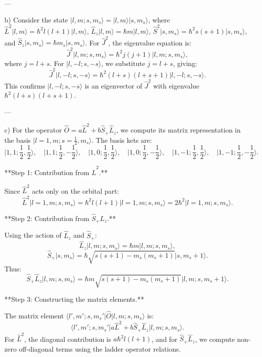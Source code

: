 ---

b) Consider the state $\lvert l, m; s, m_s \rangle = \lvert l, m \rangle \lvert s, m_s \rangle$, where $\hat{L}^2 \lvert l, m \rangle = \hbar^2 l(l+1) \lvert l, m \rangle$, $\hat{L}_z \lvert l, m \rangle = \hbar m \lvert l, m \rangle$, $\hat{S}^2 \lvert s, m_s \rangle = \hbar^2 s(s+1) \lvert s, m_s \rangle$, and $\hat{S}_z \lvert s, m_s \rangle = \hbar m_s \lvert s, m_s \rangle$. For $\hat{J}^2$, the eigenvalue equation is:
\[
\hat{J}^2 \lvert l, m; s, m_s \rangle = \hbar^2 j(j+1) \lvert l, m; s, m_s \rangle,
\]
where $j = l + s$. For $\lvert l, -l; s, -s \rangle$, we substitute $j = l + s$, giving:
\[
\hat{J}^2 \lvert l, -l; s, -s \rangle = \hbar^2 (l+s)(l+s+1) \lvert l, -l; s, -s \rangle.
\]
This confirms $\lvert l, -l; s, -s \rangle$ is an eigenvector of $\hat{J}^2$ with eigenvalue $\hbar^2 (l+s)(l+s+1)$.

---

c) For the operator $\hat{O} = a \hat{L}^2 + b \hat{S}_+ \hat{L}_z$, we compute its matrix representation in the basis $\lvert l = 1, m; s = \frac{1}{2}, m_s \rangle$. The basis kets are:
\[
\lvert 1, 1; \frac{1}{2}, \frac{1}{2} \rangle, \quad \lvert 1, 1; \frac{1}{2}, -\frac{1}{2} \rangle, \quad \lvert 1, 0; \frac{1}{2}, \frac{1}{2} \rangle, \quad \lvert 1, 0; \frac{1}{2}, -\frac{1}{2} \rangle, \quad \lvert 1, -1; \frac{1}{2}, \frac{1}{2} \rangle, \quad \lvert 1, -1; \frac{1}{2}, -\frac{1}{2} \rangle.
\]

**Step 1: Contribution from $\hat{L}^2$.**

Since $\hat{L}^2$ acts only on the orbital part:
\[
\hat{L}^2 \lvert l = 1, m; s, m_s \rangle = \hbar^2 l(l+1) \lvert l = 1, m; s, m_s \rangle = 2\hbar^2 \lvert l = 1, m; s, m_s \rangle.
\]

**Step 2: Contribution from $\hat{S}_+ \hat{L}_z$.**

Using the action of $\hat{L}_z$ and $\hat{S}_+$:
\[
\hat{L}_z \lvert l, m; s, m_s \rangle = \hbar m \lvert l, m; s, m_s \rangle,
\]
\[
\hat{S}_+ \lvert s, m_s \rangle = \hbar \sqrt{s(s+1) - m_s(m_s + 1)} \lvert s, m_s + 1 \rangle.
\]
Thus:
\[
\hat{S}_+ \hat{L}_z \lvert l, m; s, m_s \rangle = \hbar m \sqrt{s(s+1) - m_s(m_s + 1)} \lvert l, m; s, m_s + 1 \rangle.
\]

**Step 3: Constructing the matrix elements.**

The matrix element $\langle l', m'; s, m_s' \lvert \hat{O} \lvert l, m; s, m_s \rangle$ is:
\[
\langle l', m'; s, m_s' \lvert a \hat{L}^2 + b \hat{S}_+ \hat{L}_z \lvert l, m; s, m_s \rangle.
\]
For $\hat{L}^2$, the diagonal contribution is $a \hbar^2 l(l+1)$, and for $\hat{S}_+ \hat{L}_z$, we compute non-zero off-diagonal terms using the ladder operator relations.

